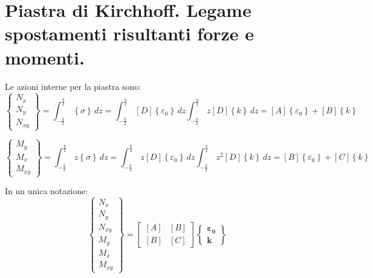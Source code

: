 \section{Piastra di Kirchhoff. Legame spostamenti risultanti forze e momenti.}

Le azioni interne per la piastra sono:
\begin{equation*}
    \left\{
\begin{array}{c}
N_x \\
N_y\\
N_{xy}
\end{array}
\right\} = \int_{-\frac{b}{2}}^{\frac{b}{2}}\,  \left\{\sigma\right\} \,dz
=  \int_{-\frac{b}{2}}^{\frac{b}{2}}\, [D] \left\{\varepsilon_0\right\} \,dz
 \int_{-\frac{b}{2}}^{\frac{b}{2}}\,z [D] \left\{k\right\} \,dz
 =[A]   \left\{\varepsilon_0\right\}  +[B] \left\{k\right\}
\end{equation*}

\begin{equation*}
    \left\{
\begin{array}{c}
M_y \\
M_x\\
M_{xy}
\end{array}
\right\} = \int_{-\frac{b}{2}}^{\frac{b}{2}}\,  z\left\{\sigma\right\} \,dz
=  \int_{-\frac{b}{2}}^{\frac{b}{2}}\, z[D] \left\{\varepsilon_0\right\} \,dz
 \int_{-\frac{b}{2}}^{\frac{b}{2}}\,z^2 [D] \left\{k\right\} \,dz
 =[B]   \left\{\varepsilon_0\right\}  +[C] \left\{k\right\}
\end{equation*}

In un unica notazione:
\begin{equation*}
\left\{
\begin{array}{c}
N_x \\
N_y\\
N_{xy}\\
M_y \\
M_x\\
M_{xy}
\end{array}
\right\}
=
\begin{bmatrix}
[A] & [B] \\
[B] & [C]
\end{bmatrix}
\left\{
\begin{array}{c}
\boldsymbol{\varepsilon_0}\\
\boldsymbol{k}
\end{array}
\right\}
\end{equation*}

